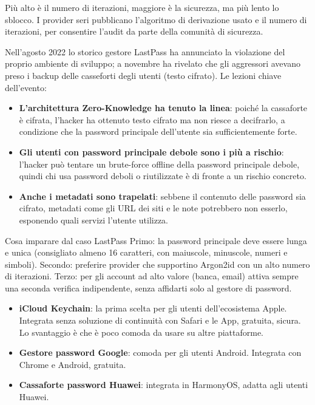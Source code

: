 Più alto è il numero di iterazioni, maggiore è la sicurezza, ma più lento lo sblocco. I provider seri pubblicano l'algoritmo di derivazione usato e il numero di iterazioni, per consentire l'audit da parte della comunità di sicurezza.


Nell'agosto 2022 lo storico gestore LastPass ha annunciato la violazione del proprio ambiente di sviluppo; a novembre ha rivelato che gli aggressori avevano preso i backup delle casseforti degli utenti (testo cifrato). Le lezioni chiave dell'evento:

\begin{itemize}
  \item \textbf{L'architettura Zero-Knowledge ha tenuto la linea}: poiché la cassaforte è cifrata, l'hacker ha ottenuto testo cifrato ma non riesce a decifrarlo, a condizione che la password principale dell'utente sia sufficientemente forte.
  \item \textbf{Gli utenti con password principale debole sono i più a rischio}: l'hacker può tentare un brute-force offline della password principale debole, quindi chi usa password deboli o riutilizzate è di fronte a un rischio concreto.
  \item \textbf{Anche i metadati sono trapelati}: sebbene il contenuto delle password sia cifrato, metadati come gli URL dei siti e le note potrebbero non esserlo, esponendo quali servizi l'utente utilizza.
\end{itemize}

\begin{tcbwarn}{Cosa imparare dal caso LastPass}
Primo: la password principale deve essere lunga e unica (consigliato almeno 16 caratteri, con maiuscole, minuscole, numeri e simboli). Secondo: preferire provider che supportino Argon2id con un alto numero di iterazioni. Terzo: per gli account ad alto valore (banca, email) attiva sempre una seconda verifica indipendente, senza affidarti solo al gestore di password.

\end{tcbwarn}



\begin{itemize}
  \item \textbf{iCloud Keychain}: la prima scelta per gli utenti dell'ecosistema Apple. Integrata senza soluzione di continuità con Safari e le App, gratuita, sicura. Lo svantaggio è che è poco comoda da usare su altre piattaforme.
  \item \textbf{Gestore password Google}: comoda per gli utenti Android. Integrata con Chrome e Android, gratuita.
  \item \textbf{Cassaforte password Huawei}: integrata in HarmonyOS, adatta agli utenti Huawei.
\end{itemize}

